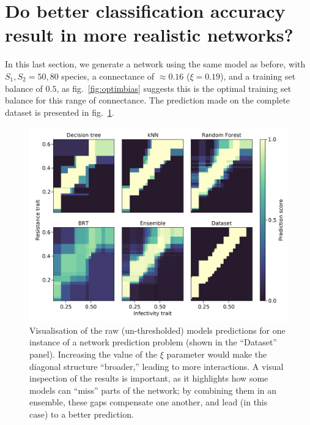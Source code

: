 \documentclass[10pt,oneside]{article}
\makeatletter
\def\maxwidth{\ifdim\Gin@nat@width>\linewidth\linewidth
\else\Gin@nat@width\fi}
\let\Oldincludegraphics\includegraphics
\renewcommand{\includegraphics}[1]{\Oldincludegraphics[width=\maxwidth]{#1}}
\makeatother
\begin{document}
\hypertarget{do-better-classification-accuracy-result-in-more-realistic-networks}{%
\section{Do better classification accuracy result in more realistic
networks?}\label{do-better-classification-accuracy-result-in-more-realistic-networks}}

In this last section, we generate a network using the same model as
before, with \(S_1, S_2 = 50, 80\) species, a connectance of
\(\approx 0.16\) (\(\xi = 0.19\)), and a training set balance of
\(0.5\), as fig.~\ref{fig:optimbias} suggests this is the optimal
training set balance for this range of connectance. The prediction made
on the complete dataset is presented in fig.~\ref{fig:ecovalid}.

\begin{figure}
\hypertarget{fig:ecovalid}{%
\centering
\includegraphics{figures/valid_ensemble.png}
\caption{Visualisation of the raw (un-thresholded) models predictions
for one instance of a network prediction problem (shown in the
``Dataset'' panel). Increasing the value of the \(\xi\) parameter would
make the diagonal structure ``broader,'' leading to more interactions. A
visual inspection of the results is important, as it highlights how some
models can ``miss'' parts of the network; by combining them in an
ensemble, these gaps compensate one another, and lead (in this case) to
a better prediction.}\label{fig:ecovalid}
}
\end{figure}
\end{document}
